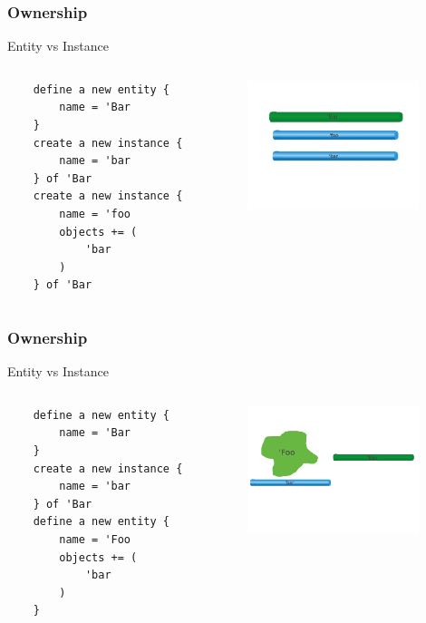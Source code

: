 \documentclass{beamer}
\begin{document}
\begin{frame}[fragile]
    \frametitle{Ownership}
    Entity vs Instance
    \begin{columns}[T]
    \begin{column}[T]{5.2cm}
    \begin{lstlisting}
    define a new entity {
        name = 'Bar
    }
    create a new instance {
        name = 'bar
    } of 'Bar
    create a new instance {
        name = 'foo
        objects += (
            'bar
        )
    } of 'Bar
    \end{lstlisting}
    \end{column}

    \begin{column}[T]{5cm}
    \includegraphics[width=5cm]{bar-owner}
    \end{column}
    \end{columns}
\end{frame}

\begin{frame}[fragile]
    \frametitle{Ownership}
    Entity vs Instance
    \begin{columns}[T]
    \begin{column}[T]{5.2cm}
    \begin{lstlisting}
    define a new entity {
        name = 'Bar
    }
    create a new instance {
        name = 'bar
    } of 'Bar
    define a new entity {
        name = 'Foo
        objects += (
            'bar
        )
    }
    \end{lstlisting}
    \end{column}

    \begin{column}[T]{5cm}
    \includegraphics[width=5cm]{foo-bar-owner}
    \end{column}
    \end{columns}
\end{frame}
\end{document}
